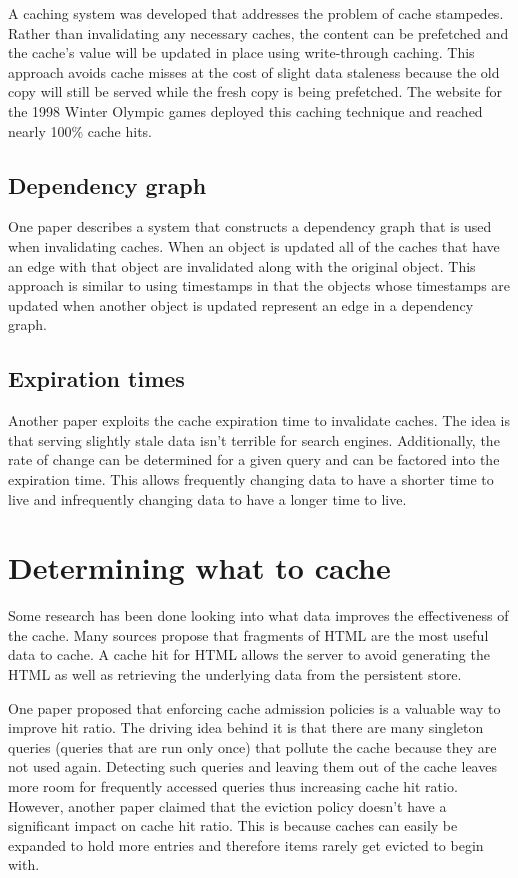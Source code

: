 \documentclass[12pt]{ucthesis}
\begin{document}
A caching system was developed that addresses the problem of cache stampedes.\cite{scalableConsistentCaching}
Rather than invalidating any necessary caches, the content can be prefetched and the cache's value will be updated in place using write-through caching.
This approach avoids cache misses at the cost of slight data staleness because the old copy will still be served while the fresh copy is being prefetched.
The website for the 1998 Winter Olympic games deployed this caching technique and reached nearly 100\% cache hits.\cite{scalableConsistentCaching}

\subsection{Dependency graph}
One paper describes a system that constructs a dependency graph that is used when invalidating caches.\cite{scalableConsistentCaching}
When an object is updated all of the caches that have an edge with that object are invalidated along with the original object.
This approach is similar to using timestamps in that the objects whose timestamps are updated when another object is updated represent an edge in a dependency graph.

\subsection{Expiration times}
Another paper exploits the cache expiration time to invalidate caches.\cite{refreshingPerspectiveSearch}
The idea is that serving slightly stale data isn't terrible for search engines.
Additionally, the rate of change can be determined for a given query and can be factored into the expiration time.
This allows frequently changing data to have a shorter time to live and infrequently changing data to have a longer time to live.

\section{Determining what to cache}
Some research has been done looking into what data improves the effectiveness of the cache.
Many sources propose that fragments of HTML are the most useful data to cache.\cite{comparisonOfCachingSolutions}\cite{scalableConsistentCaching}
A cache hit for HTML allows the server to avoid generating the HTML as well as retrieving the underlying data from the persistent store.\cite{howBasecampGotSoFast}

One paper proposed that enforcing cache admission policies is a valuable way to improve hit ratio.\cite{cacheAdmissionPolicies}
The driving idea behind it is that there are many singleton queries (queries that are run only once) that pollute the cache because they are not used again.
Detecting such queries and leaving them out of the cache leaves more room for frequently accessed queries thus increasing cache hit ratio.
However, another paper claimed that the eviction policy doesn't have a significant impact on cache hit ratio.\cite{refreshingPerspectiveSearch}
This is because caches can easily be expanded to hold more entries and therefore items rarely get evicted to begin with.\cite{refreshingPerspectiveSearch}
\end{document}
